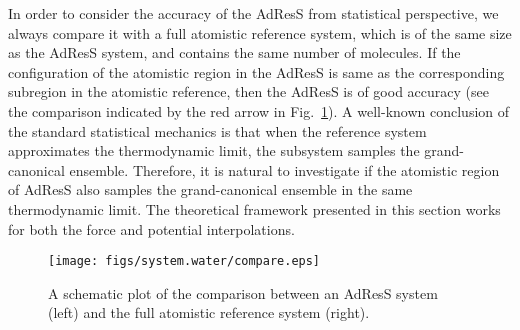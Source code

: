 \documentclass[epjST]{svjour}
\newcommand{\recheck}[1]{{\color{red} #1}}
\begin{document}
In order to consider the accuracy of the AdResS from statistical perspective, we always compare it with a full
atomistic reference system, which is of the same size as the AdResS system,
and contains the same number of molecules.
If the configuration of the atomistic region in the AdResS 
is same as the corresponding subregion in the atomistic reference, then
the AdResS  is of good accuracy (see the comparison indicated by the red arrow in Fig.~\ref{fig:compare}).
A well-known conclusion of the standard statistical mechanics is that
when the reference system approximates the thermodynamic limit, the subsystem
\recheck{samples} the grand-canonical ensemble. Therefore, it is natural to investigate
if the atomistic region of AdResS also \recheck{samples} the grand-canonical ensemble
in the same thermodynamic limit. The theoretical framework presented in this section works for
both the force and potential interpolations.

\begin{figure}
  \centering
  \texttt{[image: figs/system.water/compare.eps]}
  \caption{A schematic plot of the comparison between an AdResS system (left) and the full atomistic reference system (right).}
  \label{fig:compare}
\end{figure}
\end{document}
